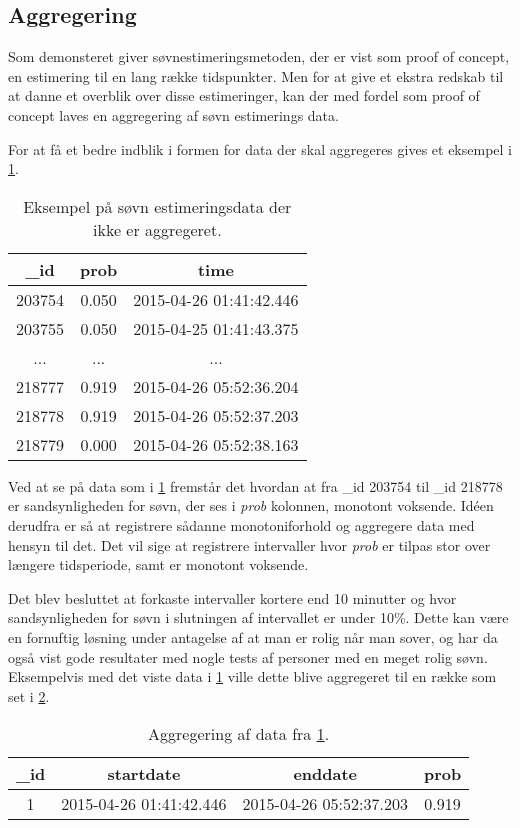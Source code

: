 \subsection{Aggregering}\label{subsec:soevnaggre}
Som demonsteret giver søvnestimeringsmetoden, der er vist som proof of concept, en estimering til en lang række tidspunkter.
Men for at give et ekstra redskab til at danne et overblik over disse estimeringer, kan der med fordel som proof of concept laves en aggregering af søvn estimerings data.

For at få et bedre indblik i formen for data der skal aggregeres gives et eksempel i \cref{tab:noaggsoevndata}.
\begin{table}[h]
	\centering
\begin{tabular}{|c|c|c|}
	\hline {\_}id & prob & time \\ 
	\hline 203754 & 0.050 & 2015-04-26 01:41:42.446 \\ 
	\hline 203755 & 0.050 & 2015-04-25 01:41:43.375 \\ 
	\hline ... & ... & ... \\ 
	\hline 218777 & 0.919 & 2015-04-26 05:52:36.204 \\ 
	\hline 218778 & 0.919 & 2015-04-26 05:52:37.203 \\ 
	\hline 218779 & 0.000 & 2015-04-26 05:52:38.163 \\ 
	\hline 
\end{tabular}
\caption{Eksempel på søvn estimeringsdata der ikke er aggregeret.}\label{tab:noaggsoevndata}
\end{table}
Ved at se på data som i \cref{tab:noaggsoevndata} fremstår det hvordan at fra {\_}id 203754 til {\_}id 218778 er sandsynligheden for søvn, der ses i \textit{prob} kolonnen, monotont voksende.
Idéen derudfra er så at registrere sådanne monotoniforhold og aggregere data med hensyn til det.
Det vil sige at registrere intervaller hvor \textit{prob} er tilpas stor over længere tidsperiode, samt er monotont voksende.

Det blev besluttet at forkaste intervaller kortere end 10 minutter og hvor sandsynligheden for søvn i slutningen af intervallet er under 10\%.
Dette kan være en fornuftig løsning under antagelse af at man er rolig når man sover, og har da også vist gode resultater med nogle tests af personer med en meget rolig søvn. 
Eksempelvis med det viste data i \cref{tab:noaggsoevndata} ville dette blive aggregeret til en række som set i \cref{tab:aggdat}.

\begin{table}[h]
	\centering
\begin{tabular}{|c|c|c|c|}
	\hline {\_}id & startdate & enddate & prob \\ 
	\hline 1 & 2015-04-26 01:41:42.446 &  2015-04-26 05:52:37.203 & 0.919 \\ 
	\hline 
\end{tabular} 
\caption{Aggregering af data fra \cref{tab:noaggsoevndata}.}\label{tab:aggdat}
\end{table}

